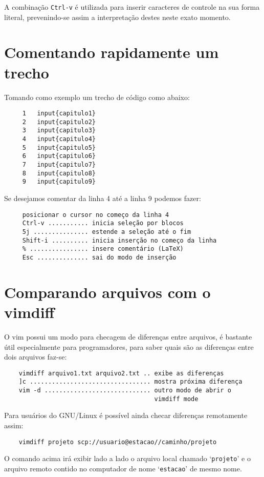 A combinação \verb|Ctrl-v| é utilizada para inserir caracteres de controle na
sua forma literal, prevenindo-se assim a interpretação destes neste exato
momento.

\section{Comentando rapidamente um trecho}

Tomando como exemplo um trecho de código como abaixo:

\begin{verbatim}
     1   input{capitulo1}
     2   input{capitulo2}
     3   input{capitulo3}
     4   input{capitulo4}
     5   input{capitulo5}
     6   input{capitulo6}
     7   input{capitulo7}
     8   input{capitulo8}
     9   input{capitulo9}
\end{verbatim}

Se desejamos comentar da linha 4 até a linha 9 podemos fazer:

\begin{verbatim}
     posicionar o cursor no começo da linha 4
     Ctrl-v ........... inicia seleção por blocos
     5j ............... estende a seleção até o fim
     Shift-i .......... inicia inserção no começo da linha
     % ................ insere comentário (LaTeX)
     Esc .............. sai do modo de inserção
\end{verbatim}

\section{Comparando arquivos com o vimdiff}
\label{sec:Comparando arquivos com o vimdiff}


O vim possui um modo para checagem de diferenças entre arquivos, é bastante
útil especialmente para programadores, para saber quais
são as diferenças entre dois arquivos faz-se:

\begin{verbatim}
    vimdiff arquivo1.txt arquivo2.txt .. exibe as diferenças
    ]c ................................. mostra próxima diferença
    vim -d ............................. outro modo de abrir o 
                                         vimdiff mode
\end{verbatim}

Para usuários do GNU/Linux é possível ainda checar diferenças remotamente assim:

\begin{verbatim}
    vimdiff projeto scp://usuario@estacao//caminho/projeto
\end{verbatim}

O comando acima irá exibir lado a lado o arquivo local chamado `{\tt projeto}' e o 
arquivo remoto contido no computador de nome `{\tt estacao}' de mesmo nome.


